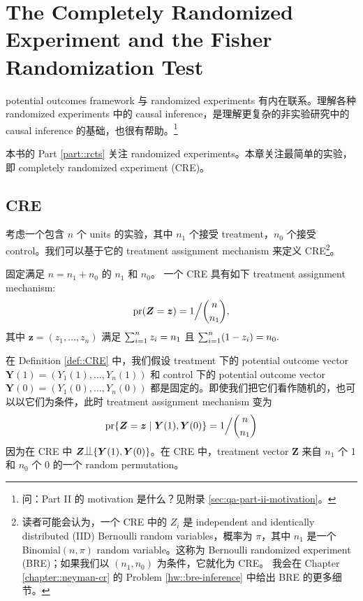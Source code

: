 
\chapter{The Completely Randomized Experiment and the Fisher Randomization Test}\label{ch::frt-cre}


potential outcomes framework 与 randomized experiments 有内在联系。理解各种 randomized experiments 中的 causal inference，是理解更复杂的非实验研究中的 causal inference 的基础，也很有帮助。\footnote{问：Part II 的 motivation 是什么？见附录 \cref{sec:qa-part-ii-motivation}。}


本书的 Part \ref{part::rcts} 关注 randomized experiments。本章关注最简单的实验，即 completely randomized experiment (CRE)。

\section{CRE}

考虑一个包含 $n$ 个 units 的实验，其中 $n_1$ 个接受 treatment，$n_0$ 个接受 control。我们可以基于它的 treatment assignment mechanism 来定义 CRE\footnote{读者可能会认为，一个 CRE 中的 $Z_i$ 是 independent and identically distributed (IID) Bernoulli random variables，概率为 $\pi$，其中 $n_1$ 是一个 Binomial$(n,\pi)$ random variable。这称为 Bernoulli randomized experiment (BRE)；如果我们以 $(n_1, n_0)$ 为条件，它就化为 CRE。
我会在 Chapter \ref{chapter::neyman-cr} 的 Problem \ref{hw::bre-inference} 中给出 BRE 的更多细节。
}。

\begin{definition}
[CRE]\label{def::CRE}
固定满足 $n = n_1 + n_0$ 的 $n_1$ 和 $n_0$。
一个 CRE 具有如下 treatment assignment mechanism:
$$
\textup{pr}(  \boldsymbol{Z} = \boldsymbol{z} ) = 1 \Big / \binom{n}{n_1},
$$
其中 $\boldsymbol{z} = (z_1,\ldots, z_n)$ 满足 $\sum_{i=1}^n z_i  = n_1$ 且 $\sum_{i=1}^n (1-z_i)  = n_0 . $
\end{definition}


在 Definition \ref{def::CRE} 中，我们假设 treatment 下的 potential outcome vector $\boldsymbol{Y}(1) = (Y_1(1), \ldots, Y_n(1) )$ 和 control 下的 potential outcome vector $\boldsymbol{Y}(0) = (Y_1(0), \ldots, Y_n(0) )$ 都是固定的。即使我们把它们看作随机的，也可以以它们为条件，此时 treatment assignment mechanism 变为
$$
\textup{pr}\{    \boldsymbol{Z} = \boldsymbol{z} \mid \boldsymbol{Y}(1), \boldsymbol{Y}(0)  \} = 1 \Big / \binom{n}{n_1} 
$$
因为在 CRE 中 $ \boldsymbol{Z} \ind \{\boldsymbol{Y}(1), \boldsymbol{Y}(0)\}$。在 CRE 中，treatment vector $\boldsymbol{Z}$ 来自 $n_1$ 个 1 和 $n_0$ 个 0 的一个 random permutation。

